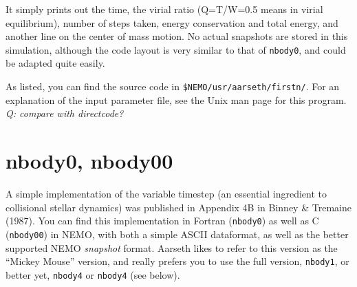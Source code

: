 It simply prints out the time, the virial ratio (Q=T/W=0.5 means in virial
equilibrium), number of steps taken, energy conservation and total energy, and another 
line on the center of mass motion. No actual snapshots are stored in this 
simulation, although the code layout is very similar to that of {\tt nbody0},
and could be adapted quite easily.

As listed, you can find the source code in {\tt \$NEMO/usr/aarseth/firstn/}. For 
an explanation of the input parameter file, see the Unix man page for this program.
{\it Q: compare with directcode?}

\section{nbody0, nbody00}

A simple implementation of the variable timestep (an essential ingredient
to collisional stellar dynamics) was published in Appendix 4B in
Binney \& Tremaine (1987). 
You can find this implementation in Fortran ({\tt nbody0})
as well as C ({\tt nbody00}) in NEMO, with both a simple ASCII dataformat,
as well as the better supported NEMO {\it snapshot} format. Aarseth likes
to refer to this version as the ``Mickey Mouse'' version, and really prefers
you to use the full version, {\tt nbody1}, or better yet,
{\tt nbody4} or {\tt nbody4} (see below).


